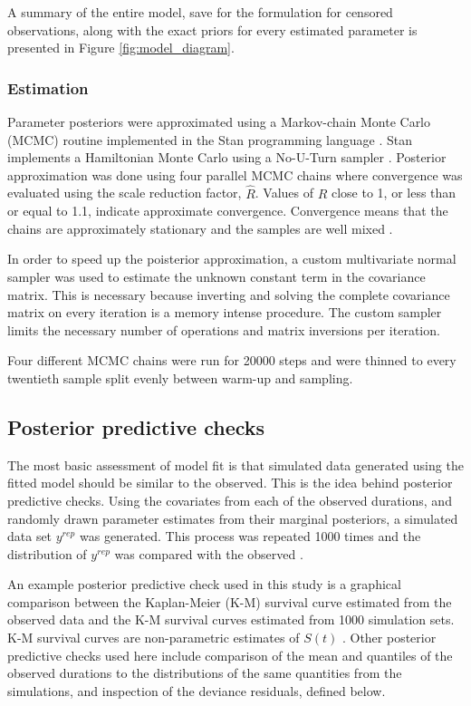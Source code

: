 \documentclass[12pt,letterpaper]{article}
\begin{document}
A summary of the entire model, save for the formulation for censored observations, along with the exact priors for every estimated parameter is presented in Figure \ref{fig:model_diagram}.


\subsubsection{Estimation}
Parameter posteriors were approximated using a Markov-chain Monte Carlo (MCMC) routine implemented in the Stan programming language \citep{2014stan}. Stan implements a Hamiltonian Monte Carlo using a No-U-Turn sampler \citep{Hoffman-Gelman:2011}. Posterior approximation was done using four parallel MCMC chains where convergence was evaluated using the scale reduction factor, \(\hat{R}\). Values of \(\hat{R}\) close to 1, or less than or equal to 1.1, indicate approximate convergence. Convergence means that the chains are approximately stationary and the samples are well mixed \citep{Gelman2013d}.

In order to speed up the poisterior approximation, a custom multivariate normal sampler was used to estimate the unknown constant term in the covariance matrix. This is necessary because inverting and solving the complete covariance matrix on every iteration is a memory intense procedure. The custom sampler limits the necessary number of operations and matrix inversions per iteration.

Four different MCMC chains were run for 20000 steps and were thinned to every twentieth sample split evenly between warm-up and sampling. 



\subsection{Posterior predictive checks}

The most basic assessment of model fit is that simulated data generated using the fitted model should be similar to the observed. This is the idea behind posterior predictive checks. Using the covariates from each of the observed durations, and randomly drawn parameter estimates from their marginal posteriors, a simulated data set \(y^{rep}\) was generated. This process was repeated 1000 times and the distribution of \(y^{rep}\) was compared with the observed \citep{Gelman2013d}.

An example posterior predictive check used in this study is a graphical comparison between the Kaplan-Meier (K-M) survival curve estimated from the observed data and the K-M survival curves estimated from 1000 simulation sets. K-M survival curves are non-parametric estimates of \(S(t)\) \citep{Klein2003}. Other posterior predictive checks used here include comparison of the mean and quantiles of the observed durations to the distributions of the same quantities from the simulations, and inspection of the deviance residuals, defined below.
\end{document}
